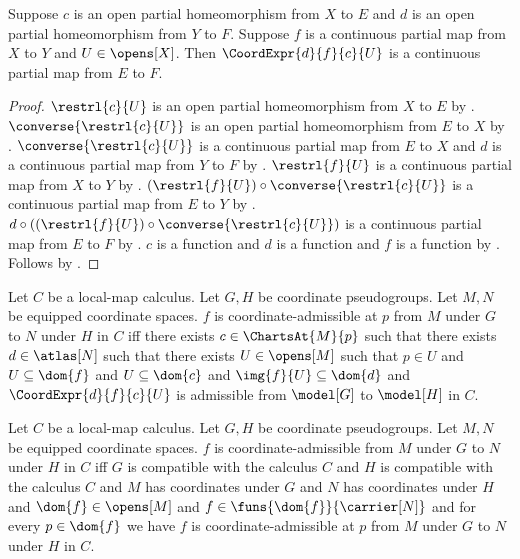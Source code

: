 \begin{theorem}\label{continuous_coordinate_expression}
    Suppose $c$ is an open partial homeomorphism from $X$ to $E$ and
        $d$ is an open partial homeomorphism from $Y$ to $F$.
    Suppose $f$ is a continuous partial map from $X$ to $Y$ and $U\in\opens[X]$.
    Then $\CoordExpr{d}{f}{c}{U}$ is a continuous partial map from $E$ to $F$.
\end{theorem}
\begin{proof}
    $\restrl{c}{U}$ is an open partial homeomorphism from $X$ to $E$ by
        .
    $\converse{\restrl{c}{U}}$ is an open partial homeomorphism from $E$ to $X$ by
        .
    $\converse{\restrl{c}{U}}$ is a continuous partial map from $E$ to $X$ and
        $d$ is a continuous partial map from $Y$ to $F$ by
        .
    $\restrl{f}{U}$ is a continuous partial map from $X$ to $Y$ by
        .
    $(\restrl{f}{U})\circ\converse{\restrl{c}{U}}$ is a continuous partial map from $E$ to $Y$ by
        .
    $d\circ((\restrl{f}{U})\circ\converse{\restrl{c}{U}})$ is a continuous partial map from $E$ to $F$ by
        .
    $c$ is a function and $d$ is a function and $f$ is a function by
        .
    Follows by .
\end{proof}

\begin{definition}\label{coordinate_admissible_at}
    Let $C$ be a local-map calculus.
    Let $G,H$ be coordinate pseudogroups.
    Let $M,N$ be equipped coordinate spaces.
    $f$ is coordinate-admissible at $p$ from $M$ under $G$ to $N$ under $H$ in $C$ iff
        there exists $c\in\ChartsAt{M}{p}$ such that there exists $d\in\atlas[N]$
        such that there exists $U\in\opens[M]$ such that
            $p\in U$ and $U\subseteq\dom{f}$ and $U\subseteq\dom{c}$ and
            $\img{f}{U}\subseteq\dom{d}$ and
            $\CoordExpr{d}{f}{c}{U}$ is admissible from $\model[G]$ to $\model[H]$ in $C$.
\end{definition}

\begin{definition}\label{coordinate_admissible_map}
    Let $C$ be a local-map calculus.
    Let $G,H$ be coordinate pseudogroups.
    Let $M,N$ be equipped coordinate spaces.
    $f$ is coordinate-admissible from $M$ under $G$ to $N$ under $H$ in $C$ iff
        $G$ is compatible with the calculus $C$ and $H$ is compatible with the calculus $C$ and
        $M$ has coordinates under $G$ and $N$ has coordinates under $H$ and
        $\dom{f}\in\opens[M]$ and $f\in\funs{\dom{f}}{\carrier[N]}$ and
        for every $p\in\dom{f}$ we have
            $f$ is coordinate-admissible at $p$ from $M$ under $G$ to $N$ under $H$ in $C$.
\end{definition}


